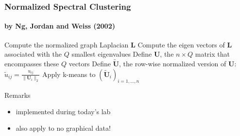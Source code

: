 \begin{frame}
  \frametitle{Normalized Spectral Clustering}
  \framesubtitle{by Ng, Jordan and Weiss (2002)}

\begin{algorithm}[H]
  \BlankLine\BlankLine
  \DontPrintSemicolon
  
  Compute the normalized graph Laplacian $\mathbf{L}$\;
  Compute the eigen vectors of $\mathbf{L}$ associated with the $Q$ \alert{smallest eigenvalues}\;
  Define $\mathbf{U}$,  the $n\times Q$ matrix  that encompasses these $Q$ vectors \;
  Define $\tilde{\mathbf{U}}$, the row-wise normalized version of $\mathbf{U}$: $ \tilde{u}_{ij} = \frac{u_{ij}}{\| \mathbf{U}_i\|_2}$\;
  Apply k-means to $(\tilde{\mathbf{U}}_i)_{i=1,\dots,n}$

  \BlankLine\BlankLine

\end{algorithm}

  \vfill

  \begin{block}{Remarks}
    \begin{itemize}
      \item implemented during today's lab
      \item also apply to no graphical data!
    \end{itemize}
  \end{block}
  
\end{frame}
% 
% 
% 
% 
% 
% 


